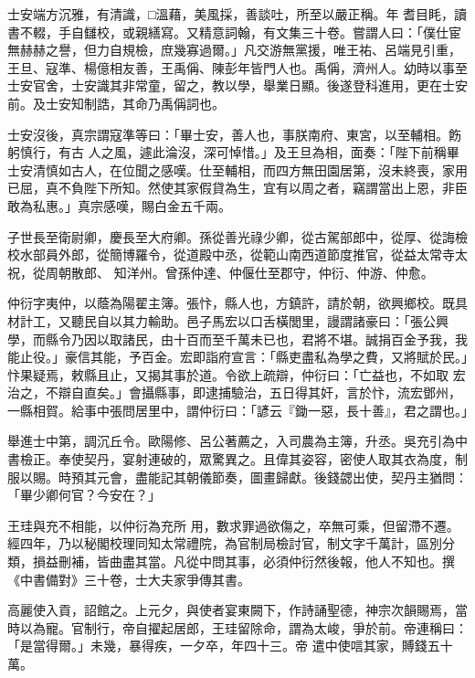 \begin{pinyinscope}
 士安端方沉雅，有清識，□溫藉，美風採，善談吐，所至以嚴正稱。年
 耆目眊，讀書不輟，手自讎校，或親繕寫。又精意詞翰，有文集三十卷。嘗謂人曰：「僕仕宦無赫赫之譽，但力自規檢，庶幾寡過爾。」凡交游無黨援，唯王祐、呂端見引重，王旦、寇準、楊億相友善，王禹偁、陳彭年皆門人也。禹偁，濟州人。幼時以事至士安官舍，士安識其非常童，留之，教以學，舉業日顯。後遂登科進用，更在士安前。及士安知制誥，其命乃禹偁詞也。



 士安沒後，真宗謂寇準等曰：「畢士安，善人也，事朕南府、東宮，以至輔相。飭躬慎行，有古
 人之風，遽此淪沒，深可悼惜。」及王旦為相，面奏：「陛下前稱畢士安清慎如古人，在位聞之感嘆。仕至輔相，而四方無田園居第，沒未終喪，家用已屈，真不負陛下所知。然使其家假貸為生，宜有以周之者，竊謂當出上恩，非臣敢為私惠。」真宗感嘆，賜白金五千兩。



 子世長至衛尉卿，慶長至大府卿。孫從善光祿少卿，從古駕部郎中，從厚、從誨檢校水部員外郎，從簡博羅令，從道殿中丞，從範山南西道節度推官，從益太常寺太祝，從周朝散郎、
 知洋州。曾孫仲達、仲偃仕至郡守，仲衍、仲游、仲愈。



 仲衍字夷仲，以蔭為陽翟主簿。張忭，縣人也，方鎮許，請於朝，欲興鄉校。既具材計工，又聽民自以其力輸助。邑子馬宏以口舌橫閭里，謾謂諸豪曰：「張公興學，而縣令乃因以取諸民，由十百而至千萬未已也，君將不堪。誠捐百金予我，我能止役。」豪信其能，予百金。宏即詣府宣言：「縣吏盡私為學之費，又將賦於民。」忭果疑焉，敕縣且止，又揭其事於道。令欲上疏辯，仲衍曰：「亡益也，不如取
 宏治之，不辯自直矣。」會攝縣事，即逮捕驗治，五日得其奸，言於忭，流宏鄧州，一縣相賀。給事中張問居里中，謂仲衍曰：「諺云『鋤一惡，長十善』，君之謂也。」



 舉進士中第，調沉丘令。歐陽修、呂公著薦之，入司農為主簿，升丞。吳充引為中書檢正。奉使契丹，宴射連破的，眾驚異之。且偉其姿容，密使人取其衣為度，制服以賜。時預其元會，盡能記其朝儀節奏，圖畫歸獻。後錢勰出使，契丹主猶問：「畢少卿何官？今安在？」



 王珪與充不相能，以仲衍為充所
 用，數求罪過欲傷之，卒無可乘，但留滯不遷。經四年，乃以秘閣校理同知太常禮院，為官制局檢討官，制文字千萬計，區別分類，損益刪補，皆曲盡其當。凡從中問其事，必須仲衍然後報，他人不知也。撰《中書備對》三十卷，士大夫家爭傳其書。



 高麗使入貢，詔館之。上元夕，與使者宴東闕下，作詩誦聖德，神宗次韻賜焉，當時以為寵。官制行，帝自擢起居郎，王珪留除命，謂為太峻，爭於前。帝連稱曰：「是當得爾。」未幾，暴得疾，一夕卒，年四十三。帝
 遣中使唁其家，賻錢五十萬。




\end{pinyinscope}
